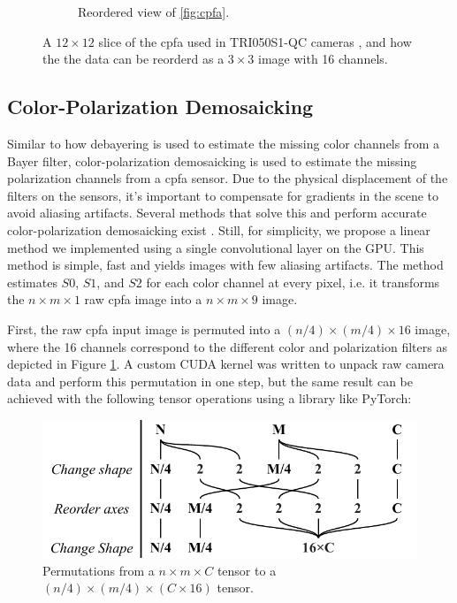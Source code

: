 \begin{figure}[H]
\begin{subfigure}[B]{.48\textwidth}
        \caption{Reordered view of \ref{fig:cpfa}. \label{fig:cpfa_reorder}}
    \end{subfigure}
    \caption{A $12\times12$ slice of the \gls{cpfa} used in TRI050S1-QC cameras \cite{lucidvisionlabsTritonMPPolarized2020}, and how the the data can be reorderd as a $3\times3$ image with 16 channels. \label{fig:polarization_sensor}}
\end{figure}%

\subsection{Color-Polarization Demosaicking}
Similar to how debayering is used to estimate the missing color channels from a Bayer filter, color-polarization demosaicking is used to estimate the missing polarization channels from a \gls{cpfa} sensor.
Due to the physical displacement of the filters on the sensors, it's important to compensate for gradients in the scene to avoid aliasing artifacts.
Several methods that solve this and perform accurate color-polarization demosaicking exist \cite{morimatsuMonochromeColorPolarization2020,morimatsuMonochromeColorPolarization2021,nguyenTwoStepColorPolarizationDemosaicking2022a}.
Still, for simplicity, we propose a linear method we implemented using a single convolutional layer on the GPU.
This method is simple, fast and yields images with few aliasing artifacts.
The method estimates $S0$, $S1$, and $S2$ for each color channel at every pixel, i.e. it transforms the $n \times m \times 1$ raw \gls{cpfa} image into a $n \times m \times 9$ image.

First, the raw \gls{cpfa} input image is permuted into a $(n/4) \times (m/4) \times 16$ image, where the 16 channels correspond to the different color and polarization filters as depicted in Figure \ref{fig:cpfa_reorder}.
A custom CUDA kernel was written to unpack raw camera data and perform this permutation in one step, but the same result can be achieved with the following tensor operations using a library like PyTorch:
\begin{figure}[H]
    \centering
    \includegraphics[width=.6\textwidth]{figures/transformation.pdf}
    \caption{Permutations from a $n \times m \times C $ tensor to a $(n/4) \times (m/4) \times (C\times 16)$ tensor. \label{fig:reorder_operations}}
    
\end{figure}%

